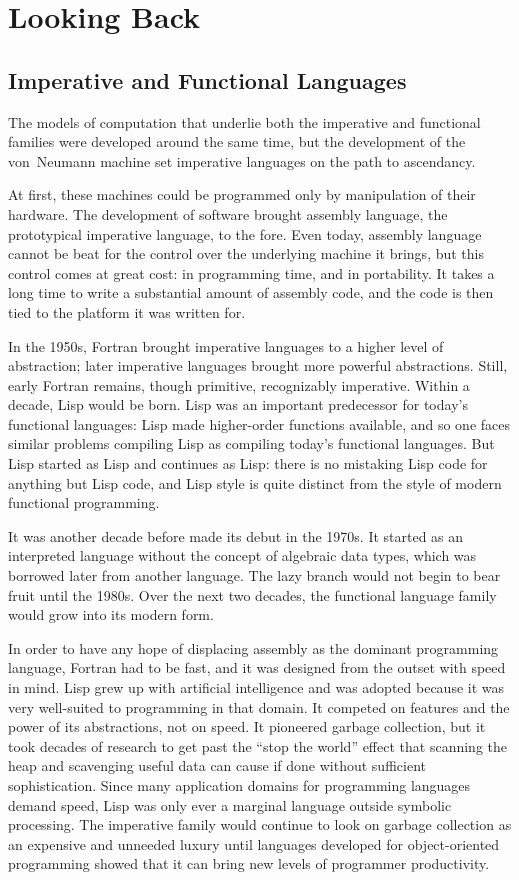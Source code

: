 \section*{Looking Back}\label{conclusion:back}
\subsection*{Imperative and Functional Languages}
The models of computation that underlie both the imperative and functional families were developed around the same time, but the development of the von~Neumann machine set imperative languages on the path to ascendancy.

At first, these machines could be programmed only by manipulation of their hardware. The development of software brought assembly language, the prototypical imperative language, to the fore. Even today, assembly language cannot be beat for the control over the underlying machine it brings, but this control comes at great cost: in programming time, and in portability. It takes a long time to write a substantial amount of assembly code, and the code is then tied to the platform it was written for.

In the 1950s, Fortran brought imperative languages to a higher level of abstraction; later imperative languages brought more powerful abstractions. Still, early Fortran remains, though primitive, recognizably imperative. Within a decade, Lisp would be born. Lisp was an important predecessor for today's functional languages: Lisp made higher-order functions available, and so one faces similar problems compiling Lisp as compiling today's functional languages. But Lisp started as Lisp and continues as Lisp: there is no mistaking Lisp code for anything but Lisp code, and Lisp style is quite distinct from the style of modern functional programming.

It was another decade before \ML made its debut in the 1970s. It started as an interpreted language without the concept of algebraic data types, which was borrowed later from another language. The lazy branch would not begin to bear fruit until the 1980s. Over the next two decades, the functional language family would grow into its modern form.

In order to have any hope of displacing assembly as the dominant programming language, Fortran had to be fast, and it was designed from the outset with speed in mind. Lisp grew up with artificial intelligence and was adopted because it was very well-suited to programming in that domain. It competed on features and the power of its abstractions, not on speed. It pioneered garbage collection, but it took decades of research to get past the ``stop the world'' effect that scanning the heap and scavenging useful data can cause if done without sufficient sophistication. Since many application domains for programming languages demand speed, Lisp was only ever a marginal language outside symbolic processing. The imperative family would continue to look on garbage collection as an expensive and unneeded luxury until languages developed for object-oriented programming showed that it can bring new levels of programmer productivity.

